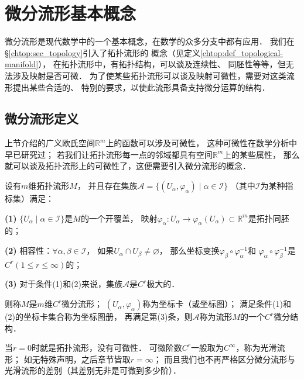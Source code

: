 \section{微分流形基本概念}\label{chdm:sec_differentiable-manifold}
微分流形是现代数学中的一个基本概念，在数学的众多分支中都有应用．
我们在\S \ref{chtop:sec_topology}引入了拓扑流形的
概念（见定义\ref{chtop:def_topological-manifold}），
在拓扑流形中，有拓扑结构，可以谈及连续性、
同胚性等等，但无法涉及映射是否可微．
为了使某些拓扑流形可以谈及映射可微性，需要对这类流形提出某些合适的、
特别的要求，以使此流形具备支持微分运算的结构．

\subsection{微分流形定义}\label{chdm:sec_dm}
上节介绍的广义欧氏空间$\mathbb{R}^m$上的函数可以涉及可微性，
这种可微性在数学分析中早已研究过；
若我们让拓扑流形每一点的邻域都具有空间$\mathbb{R}^m$上的某些属性，
那么就可以谈及拓扑流形上的可微性了，这便需要引入微分流形的概念．


\begin{definition}\label{chdm:def_Dmanifold}
    设有$m$维拓扑流形$M$，
    并且存在集族$\mathscr{A}=\{(U_\alpha, \varphi_\alpha)\mid \alpha\in \mathscr{I}\}$
    （其中$\mathscr{I}$为某种指标集）满足：
    
    {\bfseries (1)} $\{U_\alpha \mid \alpha\in \mathscr{I}\}$是$M$的一个开覆盖，
    映射$\varphi_\alpha:U_\alpha \to \varphi_\alpha( U_\alpha) \subset \mathbb{R}^m$是拓扑同胚的；
    
    {\bfseries (2)} 相容性：$\forall \alpha,\beta \in \mathscr{I}$，
    如果$ U_\alpha \cap  U_\beta \neq \varnothing $，
    那么坐标变换$\varphi_\beta \circ \varphi_\alpha^{-1} $和
    $\varphi_\alpha \circ \varphi_\beta^{-1} $是$C^r (1\leqslant r \leqslant \infty)$的；
    
    {\bfseries (3)} 对于条件(1)和(2)来说，集族$\mathscr{A}$是$C^r$极大的．
    
    则称$M$是$m$维$C^r${\heiti 微分流形}；
    $(U_\alpha, \varphi_\alpha)$称为{\heiti 坐标卡}（或坐标图）；
    满足条件(1)和(2)的坐标卡集合称为{\heiti 坐标图册}，
    再满足第(3)条，则$\mathscr{A}$称为流形$M$的一个$C^r${\heiti 微分结构}．
\end{definition}
当$r=0$时就是拓扑流形，没有可微性．
可微阶数$C^r$一般取为$C^\infty$，称为{\heiti 光滑流形}；
如无特殊声明，之后章节皆取$r=\infty$；
而且我们也不再严格区分微分流形与光滑流形的差别（其差别无非是可微到多少阶）．


